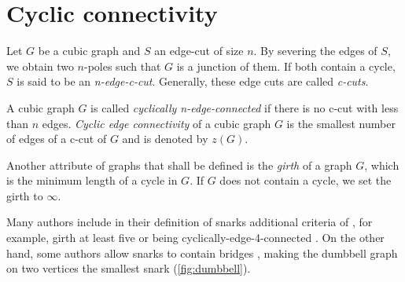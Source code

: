 \section{Cyclic connectivity}\label{sec:snarks}




%

Let $G$ be a cubic graph and $S$ an edge-cut of size $n$. By severing the edges of $S$, we obtain two $n$-poles such that $G$ is a junction of them. If both contain a cycle, $S$ is said to be an \textit{n-edge-c-cut}. Generally, these edge cuts are called \textit{c-cuts}. 

A cubic graph $G$ is called \textit{cyclically n-edge-connected} if there is no c-cut with less than $n$ edges. \textit{Cyclic edge connectivity} of a cubic graph $G$ is the smallest number of edges of a c-cut of $G$ and is denoted by $z(G)$.

Another attribute of graphs that shall be defined is the \textit{girth} of a graph $G$, which is the minimum length of a cycle in $G$. If $G$ does not contain a cycle, we set the girth to $\infty$.

Many authors include in their definition of snarks additional criteria of , for example, girth at least five or being cyclically-edge-4-connected \cite{Preissmann1983, Nedela1996}. On the other hand, some authors allow snarks to contain bridges \cite{IrreducibleSnarksSkoviera}, making the dumbbell graph on two vertices the smallest snark (\cref{fig:dumbbell}).

